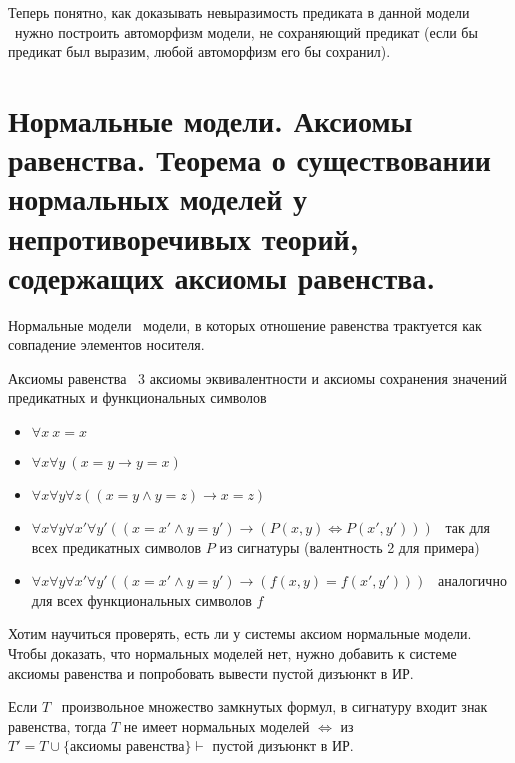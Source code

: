 \documentclass{article}
\begin{document}
Теперь понятно, как доказывать невыразимость предиката в данной модели \textemdash\ нужно построить автоморфизм модели, не сохраняющий предикат (если бы предикат был выразим, любой автоморфизм его бы сохранил).

\setcounter{section}{24}
\section{Нормальные модели. Аксиомы равенства. Теорема о существовании нормальных моделей у непротиворечивых теорий, содержащих аксиомы равенства.}

\begin{definition}
	Нормальные модели \textemdash\ модели, в которых отношение равенства трактуется как совпадение элементов носителя.
\end{definition}

\begin{definition}
	Аксиомы равенства \textemdash\ 3 аксиомы эквивалентности и аксиомы сохранения значений предикатных и функциональных символов
\end{definition}
\begin{itemize}
	\item \(\forall x\ x = x\)
	\item \(\forall x \forall y\ (x = y \rightarrow y = x)\)
	\item \(\forall x \forall y \forall z ((x = y \wedge y = z) \rightarrow x = z)\)
	\item \(\forall x \forall y \forall x' \forall y' ((x = x' \wedge y = y') \rightarrow (P(x, y) \iff P(x', y')))\) \textemdash\ так для всех предикатных символов \(P\) из сигнатуры (валентность 2 для примера)
	\item \(\forall x \forall y \forall x' \forall y' ((x = x' \wedge y = y') \rightarrow (f(x, y) = f(x', y')))\) \textemdash\ аналогично для всех функциональных символов \(f\)
\end{itemize}

Хотим научиться проверять, есть ли у системы аксиом нормальные модели. Чтобы доказать, что нормальных моделей нет, нужно добавить к системе аксиомы равенства и попробовать вывести пустой дизъюнкт в ИР.

\begin{theorem}
	Если \(T\) \textemdash\ произвольное множество замкнутых формул, в сигнатуру входит знак равенства, тогда \(T\) не имеет нормальных моделей \(\iff\) из \(T' = T \cup \{\text{аксиомы равенства}\} \vdash \) пустой дизъюнкт в ИР.
\end{theorem}
\end{document}
